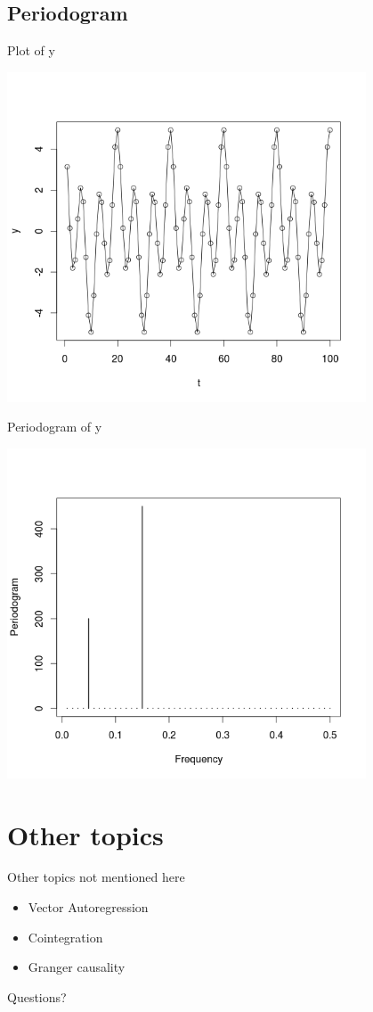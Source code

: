 \documentclass{beamer}
\begin{document}
\subsection{Periodogram}

\begin{frame}{Plot of y}

\begin{center}
\includegraphics[width=0.8\textwidth]{img/cos_y.png}
\end{center}

\end{frame}

\begin{frame}{Periodogram of y}

\begin{center}
\includegraphics[width=0.8\textwidth]{img/cos_y_periodogram.png}
\end{center}

\end{frame}

\section{Other topics}


\begin{frame}{Other topics not mentioned here}
\begin{itemize}
\item Vector Autoregression
\item Cointegration
\item Granger causality
\end{itemize}
\end{frame}

\begin{frame}
Questions?
\end{frame}
\end{document}
